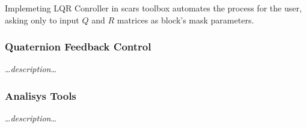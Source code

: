         Implemeting LQR Conroller in \ac{scars} toolbox automates the process for the user, asking only to input $Q$ and $R$ matrices as block's mask parameters.

    \subsubsection{Quaternion Feedback Control}
        \dots\textit{description}\dots
    
    \subsubsection{Analisys Tools}
        \dots\textit{description}\dots